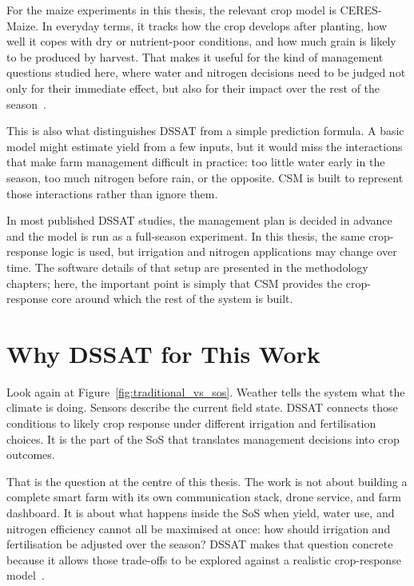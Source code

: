 For the maize experiments in this thesis, the relevant crop model is
CERES-Maize. In everyday terms, it tracks how the crop develops after planting,
how well it copes with dry or nutrient-poor conditions, and how much grain is
likely to be produced by harvest. That makes it useful for the kind of management
questions studied here, where water and nitrogen decisions need to be judged not
only for their immediate effect, but also for their impact over the rest of the
season~\cite{boote2019cropmodelling, sachin2019dssat}.

This is also what distinguishes DSSAT from a simple prediction formula. A basic
model might estimate yield from a few inputs, but it would miss the interactions
that make farm management difficult in practice: too little water early in the
season, too much nitrogen before rain, or the opposite. CSM is built to represent
those interactions rather than ignore them.

In most published DSSAT studies, the management plan is decided in advance and the
model is run as a full-season experiment. In this thesis, the same crop-response
logic is used, but irrigation and nitrogen applications may change over time. The
software details of that setup are presented in the methodology chapters; here,
the important point is simply that CSM provides the crop-response core around
which the rest of the system is built.


\section{Why DSSAT for This Work}
\label{sec:dssat_architecture}

Look again at Figure~\ref{fig:traditional_vs_sos}. Weather tells the system what
the climate is doing. Sensors describe the current field state. DSSAT connects
those conditions to likely crop response under different irrigation and
fertilisation choices. It is the part of the SoS that translates management
decisions into crop outcomes.

That is the question at the centre of this thesis. The work is not about
building a complete smart farm with its own communication stack, drone service,
and farm dashboard. It is about what happens inside the SoS when yield, water
use, and nitrogen efficiency cannot all be maximised at once: how should
irrigation and fertilisation be adjusted over the season? DSSAT makes that
question concrete because it allows those trade-offs to be explored against a
realistic crop-response model~\cite{hoogenboom2019dssat, sachin2019dssat}.

